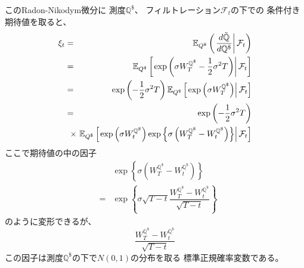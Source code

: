\documentclass[uplatex,a4j,12pt,dvipdfmx]{jsarticle}
\begin{document}
このRadon-Nikodym微分に
測度$\mathbb{Q}^{\$}$、
フィルトレーション$\mathcal{F}_{t}$の下での
条件付き期待値を取ると、
%
%
\begin{eqnarray*}
	\xi_{t}
	&=&
	\mathbb{E}_{Q^{\$}}
	\left(
	\left.
	\dfrac{d \tilde{\mathbb{Q}}}{d \mathbb{Q}^{\$}}
	\right|
	\mathcal{F}_{t}
	\right)
	\\ &=&
	\mathbb{E}_{Q^{\$}}
	\left[
		\left.
		\exp
		\left(
		\sigma W^{\mathbb{Q}^{\$}}_{T}
		- \dfrac{1}{2} \sigma^{2} T
		\right)
		\right|
		\mathcal{F}_{t}
		\right]
	\\ &=&
	\exp
	\left(
	- \dfrac{1}{2} \sigma^{2} T
	\right)
	\mathbb{E}_{Q^{\$}}
	\left[
		\left.
		\exp
		\left(
		\sigma W^{\mathbb{Q}^{\$}}_{T}
		\right)
		\right|
		\mathcal{F}_{t}
		\right]
	\\ &=&
	\exp
	\left(
	- \dfrac{1}{2} \sigma^{2} T
	\right)
	\\ && \hspace{-5mm} \times \
	\mathbb{E}_{Q^{\$}}
	\left[
		\left.
		\exp
		\left(
		\sigma W^{\mathbb{Q}^{\$}}_{t}
		\right)
		\exp
		\left\{
		\sigma
		\left(
		W^{\mathbb{Q}^{\$}}_{T} - W^{\mathbb{Q}^{\$}}_{t}
		\right)
		\right\}
		\right|
		\mathcal{F}_{t}
		\right]
\end{eqnarray*}
%
%
ここで期待値の中の因子
%
%
\begin{eqnarray*}
	&&
	\exp
	\left\{
	\sigma
	\left(
	W^{\mathbb{Q}^{\$}}_{T} - W^{\mathbb{Q}^{\$}}_{t}
	\right)
	\right\}
	\\ &=&
	\exp
	\left\{
	\sigma \sqrt{T-t}
	\dfrac{
		W^{\mathbb{Q}^{\$}}_{T} - W^{\mathbb{Q}^{\$}}_{t}
	}
	{
		\sqrt{T-t}
	}
	\right\}
\end{eqnarray*}
%
%
のように変形できるが、
$$
	\dfrac{
		W^{\mathbb{Q}^{\$}}_{T} - W^{\mathbb{Q}^{\$}}_{t}
	}
	{
		\sqrt{T-t}
	}
$$
この因子は測度$\mathbb{Q}^{\$}$の下で$N(0,1)$の分布を取る
標準正規確率変数である。
\end{document}
